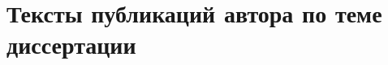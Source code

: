 \renewcommand{\chaptername}{Приложение}
\renewcommand{\appendixname}{Приложение}

\chapter{Тексты публикаций автора по теме диссертации}
\label{app:publications}

%
%
%
%
%
%
%
%
%
%
%
